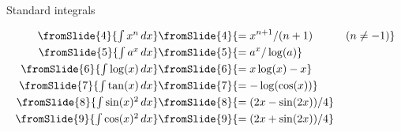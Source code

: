 \documentclass[%
pdf,
neil,
colorBG,
slideColor,
]{prosper}
\begin{document}
{\begin{slide}{Standard integrals}
{\[\begin{array}{rlcrl}
  \end{array} \] }
 \vspace{-6ex}
 \begin{align*}
  \fromSlide{4}{\textstyle\int x^n\, dx}       &
  \fromSlide{4}{= x^{n+1}/(n+1) \hspace{3em} (n\neq -1)} \\
  \fromSlide{5}{\textstyle\int a^x\, dx} &
  \fromSlide{5}{= a^x/\log(a)} \\
  \fromSlide{6}{\textstyle\int \log(x)\,dx} &
  \fromSlide{6}{= x\log(x) - x} \\
  \fromSlide{7}{\textstyle\int \tan(x)\, dx} &
  \fromSlide{7}{= -\log(\cos(x))} \\
  \fromSlide{8}{\textstyle\int \sin(x)^2\, dx} &
  \fromSlide{8}{= (2x-\sin(2x))/4} \\
  \fromSlide{9}{\textstyle\int \cos(x)^2\, dx} &
  \fromSlide{9}{= (2x+\sin(2x))/4} \\
  \end{align*}
\end{slide}
}
\end{document}
